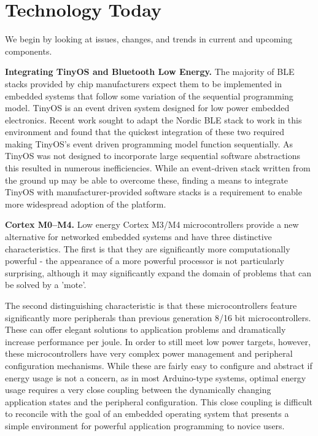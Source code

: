 \section{Technology Today}
We begin by looking at issues, changes, and trends in current and upcoming components.

\smallskip\noindent
\textbf{Integrating TinyOS and Bluetooth Low Energy.}
The majority of BLE stacks provided by chip manufacturers expect them to be
implemented in embedded systems that follow some variation of the sequential
programming model. TinyOS is an event driven system designed for low power
embedded electronics. Recent work sought to adapt the Nordic BLE stack to
work in this environment and found that the quickest integration of these two required
making TinyOS's event driven programming model function sequentially. As TinyOS
was not designed to incorporate large sequential software abstractions this
resulted in numerous inefficiencies. While an event-driven stack written from
the ground up may be able to overcome these, finding a means to integrate
TinyOS with manufacturer-provided software stacks is a requirement to enable
more widespread adoption of the platform.


\smallskip\noindent
\textbf{Cortex M0--M4.}
Low energy Cortex M3/M4 microcontrollers provide a new alternative for
networked embedded systems and have three distinctive characteristics. The
first is that they are significantly more computationally powerful - the
appearance of a more powerful processor is not particularly surprising,
although it may significantly expand the domain of problems that can be solved
by a 'mote'.

The second distinguishing characteristic is that these microcontrollers
feature significantly more peripherals than previous generation 8/16 bit
microcontrollers. These can offer elegant solutions to application problems
and dramatically increase performance per joule. In order to still meet low
power targets, however, these microcontrollers have very complex power
management and peripheral configuration mechanisms. While these are fairly
easy to configure and abstract if energy usage is not a concern, as in most
Arduino-type systems, optimal energy usage requires a very close coupling
between the dynamically changing application states and the peripheral
configuration. This close coupling is difficult to reconcile with the goal of
an embedded operating system that presents a simple environment for powerful
application programming to novice users.

